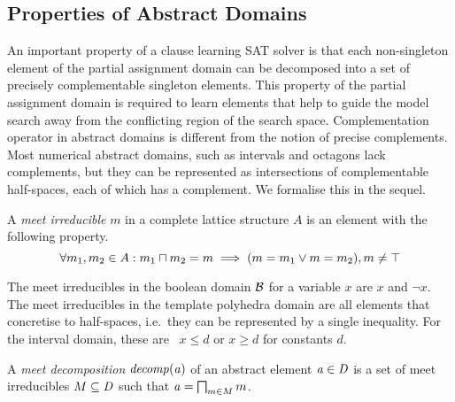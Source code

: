 \subsection{Properties of Abstract Domains}
%
An important property of a clause learning SAT solver is that each
non-singleton element of the partial assignment domain can be 
decomposed into a set of precisely complementable singleton elements.  
This property of the partial assignment domain is required to learn 
elements that help to guide the model search away from the
conflicting region of the search space.  Complementation operator 
in abstract domains is different from the notion of precise complements. 
%
Most numerical abstract domains, such as intervals and octagons lack
complements, but they can be represented as intersections of
complementable half-spaces, each of which has a complement. 
%
We formalise this in the sequel.
%
\begin{definition} 
A \emph{meet irreducible} $m$ in a complete lattice 
structure $A$ is an element with the following property.
\begin{equation}
\forall m_1, m_2 \in A: m_1 \sqcap m_2 = m \implies (m = m_1 \lor m = m_2), m \neq \top  
\end{equation}
\end{definition}
%
The meet irreducibles in the boolean domain $\mathcal{B}$ for a variable $x$ are 
$x$ and $\neg x$. The meet 
irreducibles in the template polyhedra domain are all elements 
that concretise to half-spaces, i.e.\ they can be represented 
by a single inequality. For the interval domain, these are 
\ $x \leq d$ or $x \geq d$ for constants $d$. 


\begin{definition}
A \emph{meet decomposition} ${\mathit{decomp}}(\mathit{a})$ of an abstract
element $\mathit{a} \in \mathit{D}$ is a set of meet irreducibles $M \subseteq \mathit{D}$ such that 
$\mathit{a}=\bigsqcap_{m\in M} m$.
\end{definition}

